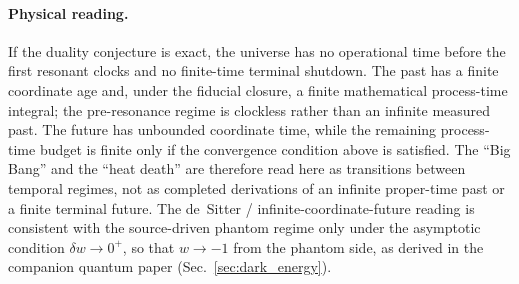 \documentclass[11pt]{article}
\begin{document}
\paragraph{Physical reading.}
If the duality conjecture is exact, the universe has no operational
time before the first resonant clocks and no finite-time terminal
shutdown.  The past has a finite coordinate age and, under the
fiducial closure, a finite mathematical process-time integral; the
pre-resonance regime is clockless rather than an infinite measured
past.  The future has unbounded coordinate time, while the remaining
process-time budget is finite only if the convergence condition above
is satisfied.  The ``Big Bang'' and the ``heat death'' are therefore
read here as transitions between temporal regimes, not as completed
derivations of an infinite proper-time past or a finite terminal
future.
The de~Sitter / infinite-coordinate-future reading is consistent with
the source-driven phantom regime only under the asymptotic condition
$\delta w\to 0^{+}$, so that $w\to -1$ from the phantom side, as
derived in the companion quantum paper (Sec.~\ref{sec:dark_energy}).
\end{document}
